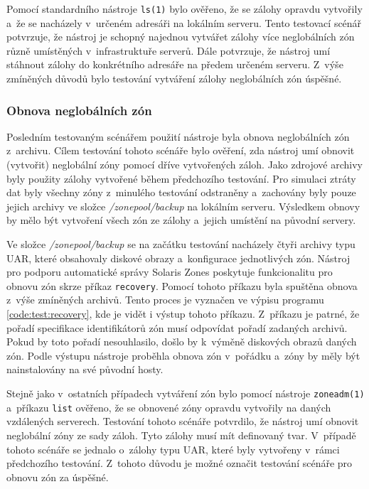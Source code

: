 Pomocí standardního nástroje \verb|ls(1)| bylo ověřeno, že se zálohy opravdu vytvořily a~že se nacházely v~určeném adresáři na
lokálním serveru. Tento testovací scénář potvrzuje, že nástroj je schopný najednou vytvářet zálohy více neglobálních zón
různě umístěných v~infrastruktuře serverů. Dále potvrzuje, že nástroj umí stáhnout zálohy do konkrétního adresáře na předem
určeném serveru. Z~výše zmíněných důvodů bylo testování vytváření zálohy neglobálních zón úspěšné.
\subsubsection{Obnova neglobálních zón}
\label{chapter:testing:scenario:backup_recovery:recovery}
Posledním testovaným scénářem použití nástroje byla obnova neglobálních zón z~archivu. Cílem testování tohoto scénáře bylo 
ověření, zda nástroj umí obnovit (vytvořit) neglobální zóny pomocí dříve vytvořených záloh. Jako zdrojové archivy byly použity
zálohy vytvořené během předchozího testování. Pro simulaci ztráty dat byly všechny zóny z~minulého testování odstraněny
a~zachovány byly pouze jejich archivy ve složce \textit{/zonepool/backup} na lokálním serveru. Výsledkem obnovy by mělo být
vytvoření všech zón ze zálohy a~jejich umístění na původní servery. 

Ve složce \textit{/zonepool/backup} se na začátku testování nacházely čtyři archivy typu UAR, které obsahovaly diskové obrazy
a~konfigurace jednotlivých zón. Nástroj pro podporu automatické správy Solaris Zones poskytuje funkcionalitu pro obnovu zón skrze
příkaz \verb|recovery|. Pomocí tohoto příkazu byla spuštěna obnova z~výše zmíněných archivů. Tento proces je vyznačen ve výpisu
programu \ref{code:test:recovery}, kde je vidět i výstup tohoto příkazu. Z~příkazu je patrné, že pořadí specifikace identifikátorů
zón musí odpovídat pořadí zadaných archivů. Pokud by toto pořadí nesouhlasilo, došlo by k~výměně diskových obrazů daných
zón. Podle výstupu nástroje proběhla obnova zón v~pořádku a~zóny by měly být nainstalovány na své původní hosty.

Stejně jako v~ostatních případech vytváření zón bylo pomocí nástroje \verb|zoneadm(1)| a~příkazu \verb|list| ověřeno, že se
obnovené zóny opravdu vytvořily na daných vzdálených serverech. Testování tohoto scénáře potvrdilo, že nástroj umí obnovit
neglobální zóny ze sady záloh. Tyto zálohy musí mít definovaný tvar.
V~případě tohoto scénáře se jednalo o~zálohy typu UAR, které byly vytvořeny v~rámci předchozího testování. Z~tohoto důvodu je možné
označit testování scénáře pro obnovu zón za úspěšné.
